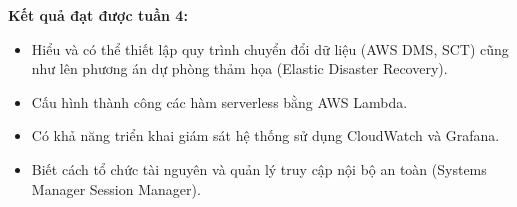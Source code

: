 \vspace{0.5em}\noindent\textbf{Kết quả đạt được tuần
4:}\par

\begin{itemize}
\tightlist
\item
  Hiểu và có thể thiết lập quy trình chuyển đổi dữ liệu (AWS DMS, SCT)
  cũng như lên phương án dự phòng thảm họa (Elastic Disaster Recovery).
\item
  Cấu hình thành công các hàm serverless bằng AWS Lambda.
\item
  Có khả năng triển khai giám sát hệ thống sử dụng CloudWatch và
  Grafana.
\item
  Biết cách tổ chức tài nguyên và quản lý truy cập nội bộ an toàn
  (Systems Manager Session Manager).
\end{itemize}
